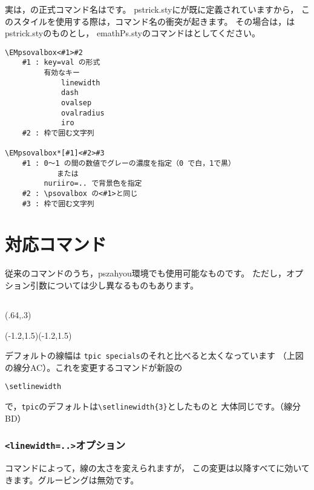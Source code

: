 \documentclass[a4j]{jarticle}
\begin{document}
実は，の正式コマンド名はです。
\textsf{pstrick.sty}にが既に定義されていますから，
このスタイルを使用する際は，コマンド名の衝突が起きます。
その場合は，は\textsf{pstrick.sty}のものとし，
\textsf{emathPs.sty}のコマンドはとしてください。

\begin{boxnote}
\begin{verbatim}
\EMpsovalbox<#1>#2
    #1 : key=val の形式
         有効なキー
             linewidth
             dash
             ovalsep
             ovalradius
             iro
    #2 : 枠で囲む文字列

\EMpsovalbox*[#1]<#2>#3
    #1 : 0〜1 の間の数値でグレーの濃度を指定（0 で白，1で黒）
            または
         nuriiro=.. で背景色を指定
    #2 : \psovalbox の<#1>と同じ
    #3 : 枠で囲む文字列
\end{verbatim}
\end{boxnote}

\section{対応コマンド}
従来のコマンドのうち，\textsf{pszahyou}環境でも使用可能なものです。
ただし，オプション引数については少し異なるものもあります。

\subsection{\texorpdfstring{}{Drawline}}
\begin{showEx}(.64,.3){}
\begin{pszahyou}[ul=10mm](-1.2,1.5)(-1.2,1.5)
  \Drawline{\A\C}
  \Drawline{\B\D}
\end{pszahyou}
\end{showEx}

デフォルトの線幅は \texttt{tpic specials}のそれと比べると太くなっています
（上図の線分AC）。これを変更するコマンドが新設の
\begin{jquote}
\begin{verbatim}
\setlinewidth
\end{verbatim}
\end{jquote}
で，\texttt{tpic}のデフォルトは\verb+\setlinewidth{3}+としたものと
大体同じです。（線分BD）

\subsubsection{\texttt{<linewidth=..>}オプション}
コマンドによって，線の太さを変えられますが，
この変更は以降すべてに効いてきます。グルーピングは無効です。
\end{document}
